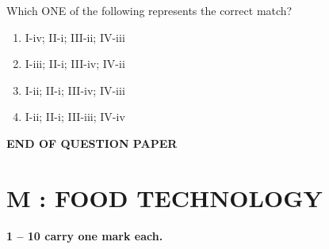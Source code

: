 \documentclass[journal,12pt,onecolumn]{IEEEtran}
\begin{document}
\begin{enumerate}[label=\arabic*.,resume]
Which ONE of the following represents the correct match?

\begin{multicols}{2}
\begin{enumerate}[label=(\Alph*)]
\item I-iv; II-i; III-ii; IV-iii
\item I-iii; II-i; III-iv; IV-ii
\item I-ii; II-i; III-iv; IV-iii
\item I-ii; II-i; III-iii; IV-iv
\end{enumerate}
\end{multicols}

\end{enumerate}

\begin{center}
\textbf{END OF QUESTION PAPER}
\end{center}
\newpage
\section*{\centering M : FOOD TECHNOLOGY}

\noindent \textbf{ 1 -- 10 carry one mark each.}
\end{document}
